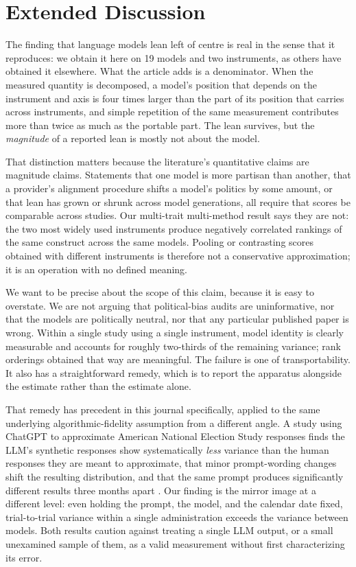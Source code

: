 \documentclass[11pt]{article}
\begin{document}
\section{Extended Discussion}
\label{si:scope}

The finding that language models lean left of centre is real in the sense
that it reproduces: we obtain it here on 19 models and two instruments, as
others have obtained it elsewhere. What the article adds is a denominator.
When the measured quantity is decomposed, a model's position that depends on the instrument and axis is four times larger than the part of its position that carries across instruments, and simple repetition of the same measurement contributes more than twice as much as the portable part. The lean survives, but the
\emph{magnitude} of a reported lean is mostly not about the model.

That distinction matters because the literature's quantitative claims are
magnitude claims. Statements that one model is more partisan than another,
that a provider's alignment procedure shifts a model's politics by some
amount, or that lean has grown or shrunk across model generations, all
require that scores be comparable across studies. Our multi-trait
multi-method result says they are not: the two most widely used instruments
produce negatively correlated rankings of the same construct across the
same models. Pooling or contrasting scores obtained with different
instruments is therefore not a conservative approximation; it is an
operation with no defined meaning.

We want to be precise about the scope of this claim, because it is easy to
overstate. We are not arguing that political-bias audits are uninformative,
nor that the models are politically neutral, nor that any particular
published paper is wrong. Within a single study using a single instrument,
model identity is clearly measurable and accounts for roughly two-thirds of
the remaining variance; rank orderings obtained that way are meaningful.
The failure is one of transportability. It also has a straightforward
remedy, which is to report the apparatus alongside the estimate rather than
the estimate alone.

That remedy has precedent in this journal specifically, applied to the same
underlying algorithmic-fidelity assumption from a different angle. A study
using ChatGPT to approximate American National Election Study responses
finds the LLM's synthetic responses show systematically \emph{less}
variance than the human responses they are meant to approximate, that
minor prompt-wording changes shift the resulting distribution, and that the
same prompt produces significantly different results three months apart
\citep{bisbee2024}. Our finding is the mirror image at a different level:
even holding the prompt, the model, and the calendar date fixed, trial-to-trial
variance within a single administration exceeds the variance between
models. Both results caution against treating a single LLM output, or a
small unexamined sample of them, as a valid measurement without first
characterizing its error.
\end{document}
